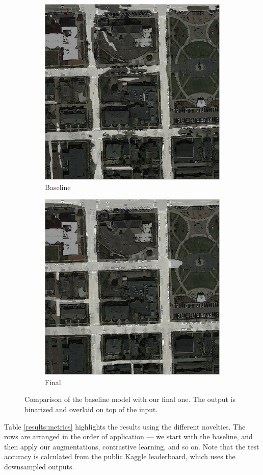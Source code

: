 \begin{figure}[b]
    \centering
    \begin{subfigure}{.5\textwidth}
        \centering
        \includegraphics[width=.65\linewidth]{images/baseline_test_136.png}
        \caption{Baseline}%
        \label{fig:res_before}
    \end{subfigure}%
    \begin{subfigure}{.5\textwidth}
        \centering
        \includegraphics[width=.65\linewidth]{images/final_test_136.png}
        \caption{Final}%
        \label{fig:res_after}
    \end{subfigure}
    \caption{%
        Comparison of the baseline model with our final one.
        The output is binarized and overlaid on top of the input.
    }
\end{figure}

Table \ref{results:metrics} highlights the results using the different novelties. The rows are arranged in the order of application --- we start with the baseline, and then apply our augmentations, contrastive learning, and so on.
Note that the test accuracy is calculated from the public Kaggle leaderboard, which uses the downsampled outputs.

